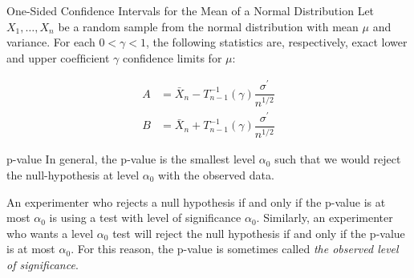 \documentclass[../main.tex]{subfiles}
\begin{document}
\begin{theorem}{One-Sided Conﬁdence Intervals for the Mean of a Normal Distribution}{}
Let $X_1, \dots, X_n$ be a random sample from the normal distribution with mean $\mu$ and variance.
For each $0 < \gamma < 1$, the following statistics are, respectively, exact lower and upper
coefﬁcient $\gamma$ conﬁdence limits for $\mu$:


\begin{equation}\label{}
\begin{split}
A &= \bar{X}_n - T_{n-1}^{-1}(\gamma)\dfrac{\sigma^{'}}{n^{1/2}}\\
B &= \bar{X}_n + T_{n-1}^{-1}(\gamma)\dfrac{\sigma^{'}}{n^{1/2}}
\end{split}
\end{equation}
\end{theorem}

\begin{definition}{p-value}{}
In general, the p-value is the smallest level $\alpha_0$ such that we would reject the null-hypothesis at level $\alpha_0$ with the observed data.

An experimenter who rejects a null hypothesis if and only if the p-value is at most $\alpha_0$ is using a test with level of signiﬁcance $\alpha_0$. Similarly, an experimenter who wants a level $\alpha_0$ test will reject the null hypothesis if and only if the p-value is at most $\alpha_0$. For this reason, the p-value is sometimes called \textit{the observed level of signiﬁcance}.
\end{definition}
\end{document}
